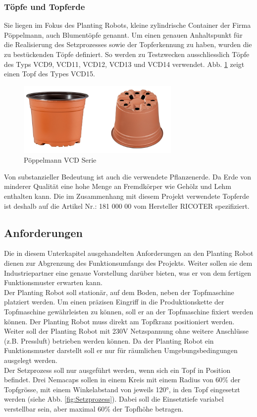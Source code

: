 \subsubsection{Töpfe und Topferde}
Sie liegen im Fokus des Planting Robots, kleine zylindrische Container der Firma Pöppelmann, auch Blumentöpfe genannt. Um einen genauen Anhaltspunkt für die Realisierung des Setzprozesses sowie der Topferkennung zu haben, wurden die zu bestückenden Töpfe definiert. So werden zu Testzwecken ausschliesslich Töpfe des Typs VCD9, VCD11, VCD12, VCD13 und VCD14 verwendet. Abb. \ref{fig:toepfe} zeigt einen Topf des Types VCD15.

\begin{figure}[H]
	\includegraphics[draft=false,width=0.7\textwidth]{Illustrationen/4-Entwurf/VCD_Serie.png}
	\caption{Pöppelmann VCD Serie \protect\cite{Poeppelmann}}
	\label{fig:toepfe}
\end{figure}

Von substanzieller Bedeutung ist auch die verwendete Pflanzenerde. Da Erde von minderer Qualität eine hohe Menge an Fremdkörper wie Gehölz und Lehm enthalten kann. Die im Zusammenhang mit diesem Projekt verwendete Topferde ist deshalb auf die Artikel Nr.: 181 000 00 vom Hersteller RICOTER spezifiziert.

\subsection{Anforderungen}
Die in diesem Unterkapitel ausgehandelten Anforderungen an den Planting Robot dienen zur Abgrenzung des Funktionsumfangs des Projekts. Weiter sollen sie dem Industriepartner eine genaue Vorstellung darüber bieten, was er von dem fertigen Funktionsmuster erwarten kann.\\
\newline
Der Planting Robot soll stationär, auf dem Boden, neben der Topfmaschine platziert werden. Um einen präzisen Eingriff in die Produktionskette der Topfmaschine gewährleisten zu können, soll er an der Topfmaschine fixiert werden können. Der Planting Robot muss direkt am Topfkranz positioniert werden. Weiter soll der Planting Robot mit 230V Netzspannung ohne weitere Anschlüsse (z.B. Pressluft) betrieben werden können. Da der Planting Robot ein Funktionsmuster darstellt soll er nur für räumlichen Umgebungsbedingungen ausgelegt werden. \\
\newline
Der Setzprozess soll nur ausgeführt werden, wenn sich ein Topf in Position befindet. Drei Nemacaps sollen in einem Kreis mit einem Radius von 60$\%$ der Topfgrösse, mit einem Winkelabstand von jeweils 120°, in den Topf eingesetzt werden (siehe Abb. \ref{fig:Setzprozess}). Dabei soll die Einsetztiefe variabel verstellbar sein, aber maximal 60$\%$ der Topfhöhe betragen. 

